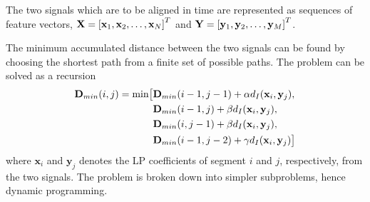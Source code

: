 The two signals which are to be aligned in time are represented as sequences of feature vectors, $\mathbf{X}=\left[\mathbf{x}_1,\mathbf{x}_2,\dotsc,\mathbf{x}_N\right]^T$ and $\mathbf{Y}=\left[\mathbf{y}_1,\mathbf{y}_2,\dotsc,\mathbf{y}_M\right]^T$. 


The minimum accumulated distance between the two signals can be found by choosing the shortest path from a finite set of possible paths. The problem can be solved as a recursion \cite{taletek}
\newcommand{\dmin}{\mathbf{D}_{min}}
\begin{equation}
	\label{eq:dtw_recursion}
	\begin{split}
		\dmin(i,j) = \min \bigl[& \dmin(i-1,j-1)+\alpha \ita(\mathbf{x}_i,\mathbf{y}_j),\\
		& \dmin(i-1,j)+\beta \ita(\mathbf{x}_i,\mathbf{y}_j),\\
		& \dmin(i,j-1)+\beta \ita(\mathbf{x}_i,\mathbf{y}_j),\\
		& \dmin(i-1,j-2)+\gamma \ita(\mathbf{x}_i,\mathbf{y}_j)\bigr]		
	\end{split}
\end{equation}
where $\mathbf{x}_i$ and $\mathbf{y}_j$ denotes the LP coefficients of segment $i$ and $j$, respectively, from the two signals. The problem is broken down into simpler subproblems, hence dynamic programming. 

